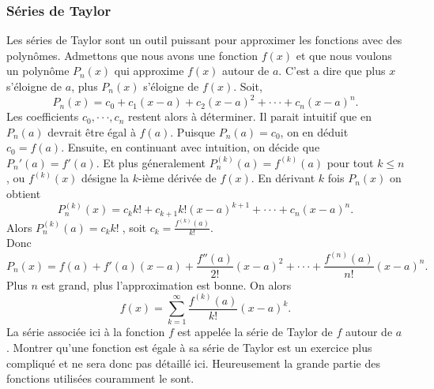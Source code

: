 \documentclass{article}
\begin{document}
\subsubsection{Séries de Taylor}
Les séries de Taylor sont un outil puissant pour approximer les fonctions avec des polynômes. Admettons que nous avons une fonction $f(x)$ et que nous voulons un polynôme $P_n(x)$ qui approxime $f(x)$ autour de $a$. C'est a dire que plus $x$ s'éloigne de $a$, plus $P_n(x)$ s'éloigne de $f(x)$. Soit,
$$P_n(x) = c_0 + c_1(x-a) + c_2(x-a)^2+\cdot\cdot\cdot+c_n(x-a)^n.$$
Les coefficients $c_0, \cdot\cdot\cdot,c_n$ restent alors à déterminer.
Il parait intuitif que en $P_n(a)$ devrait être égal à $f(a)$. Puisque $P_n(a) = c_0$, on en déduit $c_0=f(a)$. Ensuite, en continuant avec intuition, on décide que $P_n'(a) = f'(a)$. Et plus géneralement $P_n^{(k)}(a) = f^{(k)}(a)$ pour tout $k\le n$, ou $f^{(k)}(x)$ désigne la $k$-ième dérivée de $f(x)$. En dérivant $k$ fois $P_n(x)$ on obtient
$$
P_n^{(k)}(x) = c_kk!+c_{k+1}k!(x-a)^{k+1}+\cdot\cdot\cdot+c_n(x-a)^n.
$$
Alors $P_n^{(k)}(a) = c_kk!\;$, soit $c_k = \frac{f^{(k)}(a)}{k!}$.\\
Donc
$$P_n(x) = f(a) + f'(a)(x-a) + \frac{f''(a)}{2!}(x-a)^2+\cdot\cdot\cdot+\frac{f^{(n)}(a)}{n!}(x-a)^n.$$
Plus $n$ est grand, plus l'approximation est bonne.
On alors
$$f(x) = \sum_{k=1}^{\infty}\frac{f^{(k)}(a)}{k!}(x-a)^k.$$
La série associée ici à la fonction $f$ est appelée la série de Taylor de $f$ autour de $a$. Montrer qu'une fonction est égale à sa série de Taylor est un exercice plus compliqué et ne sera donc pas détaillé ici. Heureusement la grande partie des fonctions utilisées couramment le sont.
\end{document}
